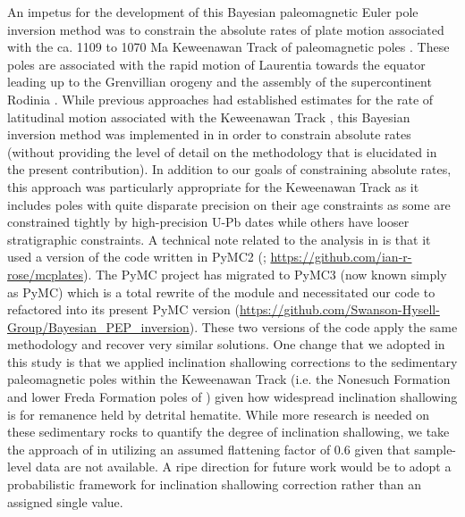 \documentclass[11pt,letterpaper]{article}
\begin{document}
An impetus for the development of this Bayesian paleomagnetic Euler pole inversion method was to constrain the absolute rates of plate motion associated with the ca. 1109 to 1070 Ma Keweenawan Track of paleomagnetic poles \citep{Halls1981a, Swanson-Hysell2009a, Swanson-Hysell2019a}. These poles are associated with the rapid motion of Laurentia towards the equator leading up to the Grenvillian orogeny and the assembly of the supercontinent Rodinia \citep{Swanson-Hysell2021a}. While previous approaches had established estimates for the rate of latitudinal motion associated with the Keweenawan Track \citep{Davis1997a, Swanson-Hysell2014b}, this Bayesian inversion method was implemented in \cite{Swanson-Hysell2019a} in order to constrain absolute rates (without providing the level of detail on the methodology that is elucidated in the present contribution). In addition to our goals of constraining absolute rates, this approach was particularly appropriate for the Keweenawan Track as it includes poles with quite disparate precision on their age constraints as some are constrained tightly by high-precision U-Pb dates \citep[e.g.][]{Fairchild2017a} while others have looser stratigraphic constraints. A technical note related to the analysis in \cite{Swanson-Hysell2019a} is that it used a version of the code written in PyMC2 (\citealp{Patil2010a}; \url{https://github.com/ian-r-rose/mcplates}). The PyMC project has migrated to PyMC3 (now known simply as PyMC) which is a total rewrite of the module \citep{Salvatier2016a} and necessitated our code to refactored into its present PyMC version (\url{https://github.com/Swanson-Hysell-Group/Bayesian_PEP_inversion}). These two versions of the code apply the same methodology and recover very similar solutions. One change that we adopted in this study is that we applied inclination shallowing corrections to the sedimentary paleomagnetic poles within the Keweenawan Track (i.e. the Nonesuch Formation and lower Freda Formation poles of \cite{Henry1977a}) given how widespread inclination shallowing is for remanence held by detrital hematite. While more research is needed on these sedimentary rocks to quantify the degree of inclination shallowing, we take the approach of \cite{Domeier2012a} in utilizing an assumed flattening factor of 0.6 given that sample-level data are not available. A ripe direction for future work would be to adopt a probabilistic framework for inclination shallowing correction rather than an assigned single value.
\end{document}
